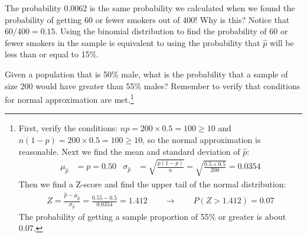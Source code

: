 \begin{example}{The probability 0.0062 is the same probability we calculated when we found the probability of getting 60 or fewer smokers out of 400! Why is this?}
Notice that $60/400=0.15$. Using the binomial distribution to find the probability of 60 or fewer smokers in the sample is equivalent to using the probability that $\hat{p}$ will be less than or equal to 15\%.
\end{example}

\begin{exercise}Given a population that is 50\% male, what is the probability that a sample of size 200 would have greater than 55\% males?  Remember to verify that conditions for normal approximation are met.\footnote{First, verify the conditions: $np = 200 \times 0.5 = 100 \ge 10$ and $n(1-p) = 200 \times 0.5 = 100 \ge 10$, so the normal approximation is reasonable. Next we find the mean and standard deviation of $\hat{p}$:
\begin{align*}
\mu_{\hat{p}} &= p = 0.50
	& \sigma_{\hat{p}} &= \sqrt{\frac{p(1-p)}{n}}
		= \sqrt{\frac{0.5 \times 0.5}{200}}
		= 0.0354
\end{align*}
Then we find a Z-score and find the upper tail of the normal distribution:
\begin{align*}
Z = \frac{\hat{p} - \mu_{\hat{p}}}{\sigma_{\hat{p}}} = \frac{0.55 - 0.5}{0.0354} = 1.412
\qquad \rightarrow \qquad
P(Z > 1.412) = 0.07
\end{align*}
The probability of getting a sample proportion of 55\% or greater is about 0.07.}
\end{exercise}

